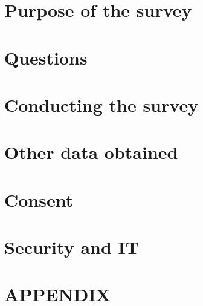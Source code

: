\documentclass[12pt,titlepage]{article}
\date{\myversion
}
\title{\mytitle}
\author{Lars Vilhuber}
\begin{document}
 \maketitle



	\thispagestyle{empty}
	\singlespacing
%		
	
	 \newpage
	 \setcounter{page}{1}
\section{Purpose of the survey}
\label{sec:intro}


\section{Questions}
\label{sec:questions}


\section{Conducting the survey}
\label{sec:conducting}


\section{Other data obtained}
\label{sec:data}


\section{Consent}
\label{sec:consent}


\section{Security and IT}
\label{sec:security}


	\singlespacing
	 \nocite{*}
	
	

\clearpage
\appendix
\section*{APPENDIX}
\setcounter{section}{1}
\label{sec:appendix}

\end{document}

